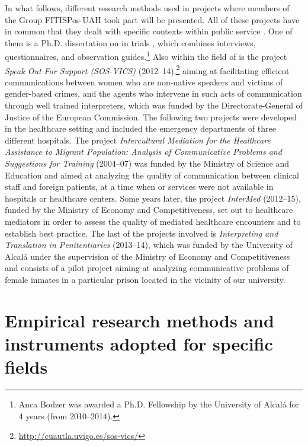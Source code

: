 \documentclass[output=paper]{LSP/langsci}
\begin{document}
In what follows, different research methods used in projects where members of the Group FITISPos-UAH took part will be presented. All of these projects have in common that they dealt with specific contexts within public service . One of them is a Ph.D. dissertation on  in  trials \citep{Bodzer2014}, which combines interviews, questionnaires, and observation guides.\footnote{Anca Bodzer was awarded a Ph.D. Fellowship by the University of Alcalá for 4 years (from 2010--2014).} Also within the field of  is the project \textit{Speak Out For Support (SOS-VICS)} (2012--14),\footnote{\url{http://cuautla.uvigo.es/sos-vics/}} aiming at facilitating efficient communications between women who are non-native speakers and victims of gender-based crimes, and the agents who intervene in such acts of communication through well trained interpreters, which was funded by the Directorate-General of Justice of the European Commission. The following two projects were developed in the healthcare setting and included the emergency departments of three different hospitals. The project \textit{Intercultural Mediation for the Healthcare Assistance to Migrant Population: Analysis of Communicative Problems and Suggestions for Training} (2004--07) was funded by the  Ministry of Science and Education and aimed at analyzing the quality of communication between clinical staff and foreign patients, at a time when  or  services were not available in hospitals or healthcare centers. Some years later, the project \textit{InterMed} (2012--15), funded by the  Ministry of Economy and Competitiveness, set out to  healthcare mediators in order to assess the quality of mediated healthcare encounters and to establish best practice. The last of the projects involved is \textit{Interpreting and Translation in Penitentiaries} (2013--14), which was funded by the University of Alcalá under the supervision of the  Ministry of Economy and Competitiveness and consists of a pilot project aiming at analyzing communicative problems of female inmates in a particular prison located in the vicinity of our university.

\section{Empirical research methods and instruments adopted for specific fields}
\end{document}
